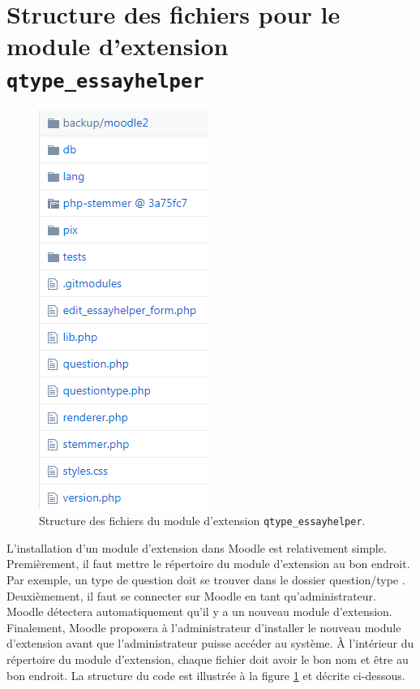 \section{Structure des fichiers pour le module d'extension \texttt{qtype\_essayhelper}}
\begin{figure}[htbp]
   \begin{center}
  \includegraphics[scale=1]{images/architecture.png}
  \end{center}
  \caption{Structure des fichiers du module d'extension \texttt{qtype\_essayhelper}.}
  \label{dev-architecture}
\end{figure}
L'installation d'un module d'extension dans Moodle est relativement simple.
Premi\`erement, il faut mettre le r\'epertoire du module d'extension au bon endroit.
Par exemple, un type de question doit se trouver dans le dossier \og question/type \fg{}.
Deuxi\`emement, il faut se connecter sur Moodle en tant qu'administrateur.
Moodle d\'etectera automatiquement qu'il y a un nouveau module d'extension.
Finalement, Moodle proposera \`a l'administrateur d'installer le nouveau module d'extension avant que l'administrateur puisse acc\'eder au syst\`eme.
\`A l'int\'erieur du r\'epertoire du module d'extension, chaque fichier doit avoir le bon nom et \^etre au bon endroit.
La structure du code est illustr\'ee \`a la figure \ref{dev-architecture} et d\'ecrite ci-dessous.
 
